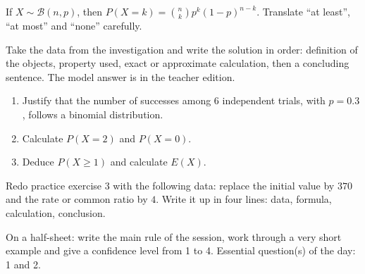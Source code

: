 \begin{traceecrite}If $X\sim\mathcal B(n,p)$, then $P(X=k)=\binom nkp^k(1-p)^{n-k}$. Translate ``at least'', ``at most'' and ``none'' carefully.\end{traceecrite}

\begin{exemple}
Take the data from the investigation and write the solution in order: definition of the objects, property used, exact or approximate calculation, then a concluding sentence. The model answer is in the teacher edition.
\end{exemple}

\begin{exercice}[-- essential]
\begin{enumerate}\item Justify that the number of successes among $6$ independent trials, with $p=0.3$, follows a binomial distribution.\item Calculate $P(X=2)$ and $P(X=0)$.\item Deduce $P(X\geq1)$ and calculate $E(X)$.\end{enumerate}
\end{exercice}


\begin{dm}Redo practice exercise 3 with the following data: replace the initial value by $370$ and the rate or common ratio by $4$. Write it up in four lines: data, formula, calculation, conclusion.\end{dm}

\begin{sortie}On a half-sheet: write the main rule of the session, work through a very short example and give a confidence level from 1 to 4. Essential question(s) of the day: 1 and 2.\end{sortie}

